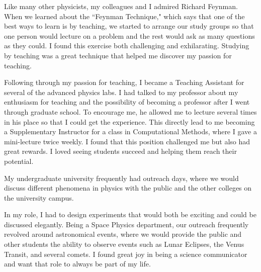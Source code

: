 \documentclass[12pt]{article}
\begin{document}
Like many other physicists, my colleagues and I admired Richard Feynman. When we
learned about the ``Feynman Technique," which says that one of the best ways to
learn is by teaching, we started to arrange our study groups so that one person
would lecture on a problem and the rest would ask as many questions as they
could. I found this exercise both challenging and exhilarating. Studying by
teaching was a great technique that helped me discover my passion for teaching.

Following through my passion for teaching, I became a Teaching Assistant for
several of the advanced physics labs. I had talked to my professor about my
enthusiasm for teaching and the possibility of becoming a professor after I went
through graduate school. To encourage me, he allowed me to lecture
several times in his place so that I could get the experience. This directly
lead to me becoming a Supplementary Instructor for a class in Computational
Methods, where I gave a mini-lecture twice weekly. I found that this position
challenged me but also had great rewards. I loved seeing students succeed and
helping them reach their potential. 

My undergraduate university frequently had outreach days, where we would discuss
different phenomena in physics with the public and the other colleges on the
university campus.

In my role, I had to design experiments that would both be exciting and could be
discussed elegantly. Being a Space Physics
department, our outreach frequently revolved around astronomical events, where
we would provide the public and other students the ability to observe events
such as Lunar Eclipses, the Venus Transit, and several comets. I found great joy
in being a science communicator and want that role to always be part of my life. 
\end{document}
